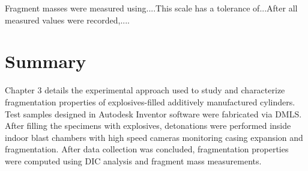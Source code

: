 Fragment masses were measured using....This scale has a tolerance of...After all measured values were recorded,....

\section{Summary} \label{sec:3_summary}
Chapter 3 details the experimental approach used to study and characterize fragmentation properties of explosives-filled additively manufactured cylinders. Test samples designed in Autodesk Inventor software were fabricated via \gls{DMLS}. After filling the specimens with explosives, detonations were performed inside indoor blast chambers with high speed cameras monitoring casing expansion and fragmentation. After data collection was concluded, fragmentation properties were computed using \gls{DIC} analysis and fragment mass measurements.


